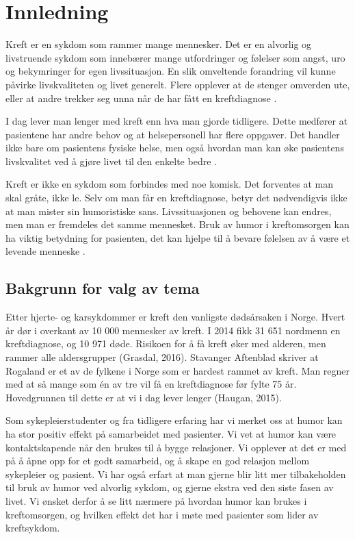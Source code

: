 \chapter{Innledning}

Kreft er en sykdom som rammer mange mennesker. Det er en alvorlig og
livstruende sykdom som innebærer mange utfordringer og følelser som angst, uro
og bekymringer for egen livssituasjon. En slik omveltende forandring vil kunne
påvirke livskvaliteten og livet generelt. Flere opplever at de stenger omverden
ute, eller at andre trekker seg unna når de har fått en kreftdiagnose 
\cite[s.~39--47]{rustoen2008}.

I dag lever man lenger med kreft enn hva man gjorde tidligere. Dette medfører
at pasientene har andre behov og at helsepersonell har flere oppgaver. Det
handler ikke bare om pasientens fysiske helse, men også hvordan man kan øke
pasientens livskvalitet ved å gjøre livet til den enkelte bedre 
\cite[s.~39]{rustoen2008}.

Kreft er ikke en sykdom som forbindes med noe komisk. Det forventes at man skal
gråte, ikke le. Selv om man får en kreftdiagnose, betyr det nødvendigvis ikke
at man mister sin humoristiske sans. Livssituasjonen og behovene kan endres,
men man er fremdeles det samme mennesket. Bruk av humor i kreftomsorgen kan ha
viktig betydning for pasienten, det kan hjelpe til å bevare følelsen av å være
et levende menneske \cite[s.~161--163]{tyrdal2002}.

\section{Bakgrunn for valg av tema}

Etter hjerte- og karsykdommer er kreft den vanligste dødsårsaken i Norge. Hvert
år dør i overkant av 10 000 mennesker av kreft. I 2014 fikk 31 651 nordmenn en
kreftdiagnose, og 10 971 døde. Risikoen for å få kreft øker med alderen, men
rammer alle aldersgrupper (Grasdal, 2016). Stavanger Aftenblad skriver at
Rogaland er et av de fylkene i Norge som er hardest rammet av kreft. Man regner
med at så mange som én av tre vil få en kreftdiagnose før fylte 75 år.
Hovedgrunnen til dette er at vi i dag lever lenger (Haugan, 2015).

Som sykepleierstudenter og fra tidligere erfaring har vi merket oss at humor
kan ha stor positiv effekt på samarbeidet med pasienter. Vi vet at humor kan
være kontaktskapende når den brukes til å bygge relasjoner. Vi opplever at det
er med på å åpne opp for et godt samarbeid, og å skape en god relasjon mellom
sykepleier og pasient. Vi har også erfart at man gjerne blir litt mer
tilbakeholden til bruk av humor ved alvorlig sykdom, og gjerne ekstra ved den
siste fasen av livet. Vi ønsket derfor å se litt nærmere på hvordan humor kan
brukes i kreftomsorgen, og hvilken effekt det har i møte med pasienter som
lider av kreftsykdom.

